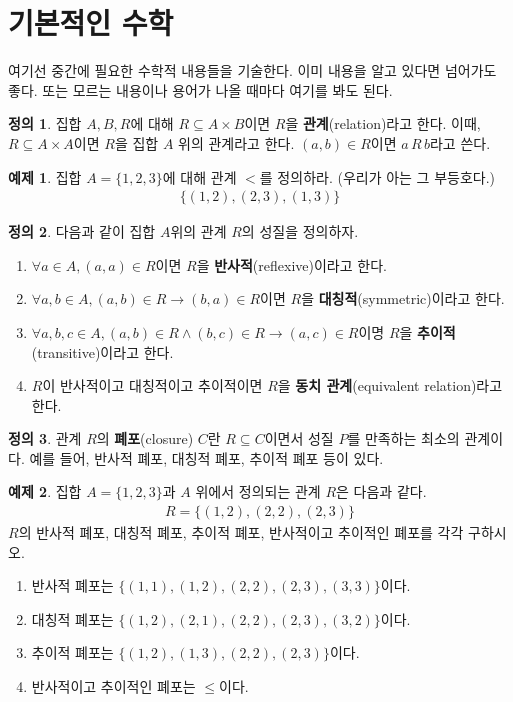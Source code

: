 \documentclass[b5paper]{book}
\theoremstyle{definition}
\newtheorem{defn}{정의}[chapter]
\newtheorem{ex}{예제}[chapter]
\begin{document}
\section{기본적인 수학}
여기선 중간에 필요한 수학적 내용들을 기술한다. 
이미 내용을 알고 있다면 넘어가도 좋다. 또는 모르는 내용이나 용어가 나올 때마다 여기를 
봐도 된다.
\begin{defn}
    집합 $A, B, R$에 대해 $R \subseteq A \times B$이면 $R$을 \textbf{관계}(relation)라고 한다.
    이때, $R \subseteq A \times A$이면 $R$을 집합 $A$ 위의 관계라고 한다. 
    $(a, b) \in R$이면 $a \, R \, b$라고 쓴다.
\end{defn}
\begin{ex}
    집합 $A = \{1, 2, 3\}$에 대해 관계 $<$를 정의하라. (우리가 아는 
    그 부등호다.)
    \begin{align*}
        \{(1, 2), (2, 3), (1, 3)\}
    \end{align*}
\end{ex}
\begin{defn}
    다음과 같이 집합 $A$위의 관계 $R$의 성질을 정의하자.
    \begin{enumerate}
        \item $\forall a \in A, (a, a) \in R$이면 $R$을 \textbf{반사적}(reflexive)이라고 한다.
        \item $\forall a, b \in A, (a, b) \in R \rightarrow (b, a) \in R$이면
        $R$을 \textbf{대칭적}(symmetric)이라고 한다.
        \item $\forall a, b, c\in A, (a, b) \in R \wedge (b, c) \in R \rightarrow 
        (a, c) \in R$이명 $R$을 \textbf{추이적}(transitive)이라고 한다.
        \item $R$이 반사적이고 대칭적이고 추이적이면 $R$을 \textbf{동치 관계}(equivalent relation)라고
        한다.
    \end{enumerate}
\end{defn}
\begin{defn}
    관계 $R$의 \textbf{폐포}(closure) $C$란 $R \subseteq C$이면서 성질 $P$를 만족하는 최소의
    관계이다. 예를 들어, 반사적 폐포, 대칭적 폐포, 추이적 폐포 등이 있다. 
\end{defn}
\begin{ex}
    집합 $A = \{1, 2, 3\}$과 $A$ 위에서 정의되는 관계 $R$은 다음과 같다.
    \begin{align*}
        R = \{(1,2), (2, 2), (2, 3)\}
    \end{align*}
    $R$의 반사적 폐포, 대칭적 폐포, 추이적 폐포, 반사적이고 추이적인 폐포를 각각 구하시오.
    \begin{enumerate}
        \item 반사적 폐포는 $\{(1, 1), (1, 2), (2, 2), (2, 3), (3, 3)\}$이다.
        \item 대칭적 폐포는 $\{(1, 2), (2, 1), (2, 2), (2, 3), (3, 2)\}$이다.
        \item 추이적 폐포는 $\{(1, 2),(1, 3), (2, 2), (2, 3) \}$이다.
        \item 반사적이고 추이적인 폐포는 $\le$이다. 
    \end{enumerate}
\end{ex}
\end{document}
